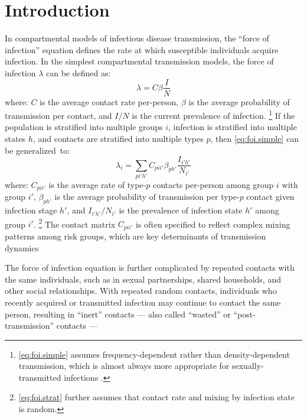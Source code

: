 \section{Introduction}\label{intro}
In compartmental models of infectious disease transmission,
the ``force of infection'' equation defines
the rate at which susceptible individuals acquire infection.
In the simplest compartmental transmission models,
the force of infection $\lambda$ can be defined as:
\begin{equation}\label{eq:foi.simple}
  \lambda = C \beta \frac{I}{N}
\end{equation} where:
$C$ is the average contact rate per-person,
$\beta$ is the average probability of transmission per contact, and
$I/N$ is the current prevalence of infection.%
\footnote{\eqref{eq:foi.simple} assumes
  frequency-dependent rather than density-dependent transmission,
  which is almost always more appropriate for sexually-transmitted infections \cite{Begon2002}.}
If the population is stratified into multiple groups $i$,
infection is stratified into multiple states $h$, and
contacts are stratified into multiple types $p$,
then \eqref{eq:foi.simple} can be generalized~to:
\begin{equation}\label{eq:foi.strat}
  \lambda_i = \sum_{pi'h'} C_{pii'} \beta_{ph'} \frac{I_{i'h'}}{N_{i'}}
\end{equation}
where:
$C_{pii'}$ is the average rate of type-$p$ contacts per-person among group $i$ with group $i'$,
$\beta_{ph'}$ is the average probability of transmission per type-$p$ contact given infection stage $h'$, and
$I_{i'h'}/N_{i'}$ is the prevalence of infection state $h'$ among group $i'$.%
\footnote{\eqref{eq:foi.strat} further assumes that
  contact rate and mixing by infection state is random.}
The contact matrix $C_{pii'}$ is often specified to reflect
complex mixing patterns among risk groups,
which are key determinants of transmission dynamics \cite{Bansal2010,Rao2021}
\par
The force of infection equation is further complicated by
repeated contacts with the same individuals, such as
in sexual partnerships, shared households, and other social relationships.
With repeated \vs random contacts, individuals who recently acquired or transmitted infection
may continue to contact the same person, resulting in ``inert'' contacts
--- also called ``wasted'' or ``post-transmission'' contacts ---
